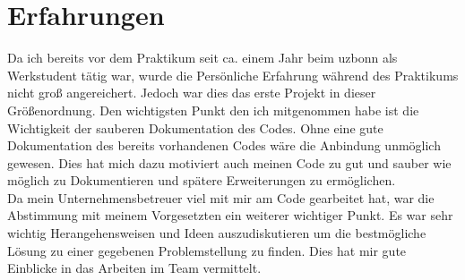 \section{Erfahrungen }\label{sec:erfahrungen}
Da ich bereits vor dem Praktikum seit ca. einem Jahr beim uzbonn als Werkstudent tätig war, wurde die Persönliche Erfahrung während des Praktikums nicht groß angereichert. Jedoch war dies das erste Projekt in dieser Größenordnung. Den wichtigsten Punkt den ich mitgenommen habe ist die Wichtigkeit der sauberen Dokumentation des Codes. Ohne eine gute Dokumentation des bereits vorhandenen Codes wäre die Anbindung unmöglich gewesen. Dies hat mich dazu motiviert auch meinen Code zu gut und sauber wie möglich zu Dokumentieren und spätere Erweiterungen zu ermöglichen. \\

Da mein Unternehmensbetreuer viel mit mir am Code gearbeitet hat, war die Abstimmung mit meinem Vorgesetzten ein weiterer wichtiger Punkt. Es war sehr wichtig Herangehensweisen und Ideen auszudiskutieren um die bestmögliche Lösung zu einer gegebenen Problemstellung zu finden. Dies hat mir gute Einblicke in das Arbeiten im Team vermittelt.


